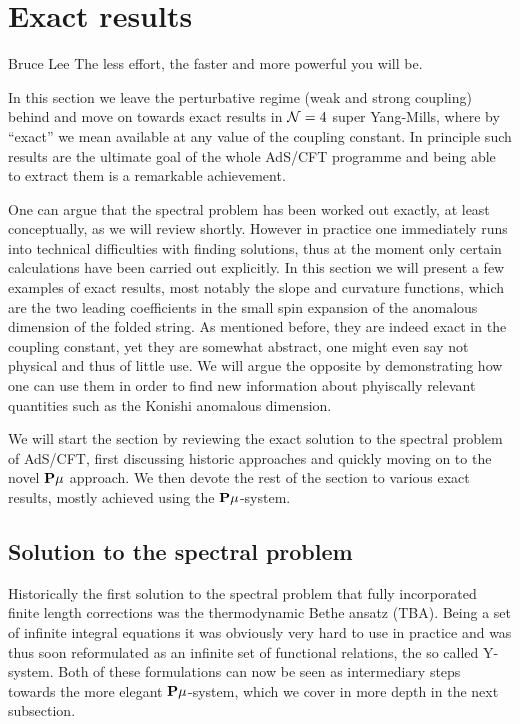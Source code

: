 
\section{Exact results}

\begin{chapquote}{Bruce Lee}
The less effort, the faster and more powerful you will be.
\end{chapquote}

\noindent In this section we leave the perturbative regime (weak and strong coupling) behind and move on towards exact results in $\mathcal{N}=4$ super Yang-Mills, where by ``exact'' we mean available at any value of the coupling constant.
In principle such results are the ultimate goal of the whole AdS/CFT programme and being able to extract them is a remarkable achievement.

One can argue that the spectral problem has been worked out exactly, at least conceptually, as we will review shortly.
However in practice one immediately runs into technical difficulties with finding solutions, thus at the moment only certain calculations have been carried out explicitly.
In this section we will present a few examples of exact results, most notably the slope and curvature functions, which are the two leading coefficients in the small spin expansion of the anomalous dimension of the folded string.
As mentioned before, they are indeed exact in the coupling constant, yet they are somewhat abstract, one might even say not physical and thus of little use.
We will argue the opposite by demonstrating how one can use them in order to find new information about phyiscally relevant quantities such as the Konishi anomalous dimension.

We will start the section by reviewing the exact solution to the spectral problem of AdS/CFT, first discussing historic approaches and quickly moving on to the novel ${\bf P}\mu$ approach.
We then devote the rest of the section to various exact results, mostly achieved using the ${\bf P}\mu$-system.


\subsection{Solution to the spectral problem}

Historically the first solution to the spectral problem that fully incorporated finite length corrections was the thermodynamic Bethe ansatz (TBA). 
Being a set of infinite integral equations it was obviously very hard to use in practice and was thus soon reformulated as an infinite set of functional relations, the so called Y-system.
Both of these formulations can now be seen as intermediary steps towards the more elegant ${\bf P}\mu$-system, which we cover in more depth in the next subsection.

